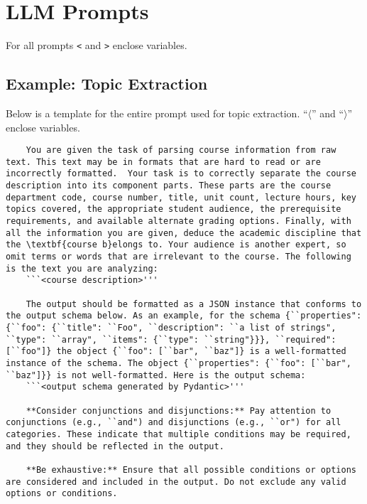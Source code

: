 \appendix
\addappheadtotoc

\chapter{LLM Prompts}\label{app:llmprompts}
For all prompts \verb|<| and \verb|>| enclose variables. 

\section{Example: Topic Extraction}\label{app:extractionprompt}
Below is a template for the entire prompt used for topic extraction. ``$\langle$'' and ``$\rangle$'' enclose variables.
\begin{lstlisting}
    You are given the task of parsing course information from raw text. This text may be in formats that are hard to read or are incorrectly formatted.  Your task is to correctly separate the course description into its component parts. These parts are the course department code, course number, title, unit count, lecture hours, key topics covered, the appropriate student audience, the prerequisite requirements, and available alternate grading options. Finally, with all the information you are given, deduce the academic discipline that the \textbf{course b}elongs to. Your audience is another expert, so omit terms or words that are irrelevant to the course. The following is the text you are analyzing:
    ```<course description>'''
    
    The output should be formatted as a JSON instance that conforms to the output schema below. As an example, for the schema {``properties": {``foo": {``title": ``Foo", ``description": ``a list of strings", ``type": ``array", ``items": {``type": ``string"}}}, ``required": [``foo"]} the object {``foo": [``bar", ``baz"]} is a well-formatted instance of the schema. The object {``properties": {``foo": [``bar", ``baz"]}} is not well-formatted. Here is the output schema:
    ```<output schema generated by Pydantic>'''
    
    **Consider conjunctions and disjunctions:** Pay attention to conjunctions (e.g., ``and") and disjunctions (e.g., ``or") for all categories. These indicate that multiple conditions may be required, and they should be reflected in the output.
    
    **Be exhaustive:** Ensure that all possible conditions or options are considered and included in the output. Do not exclude any valid options or conditions.
    

\end{lstlisting}
